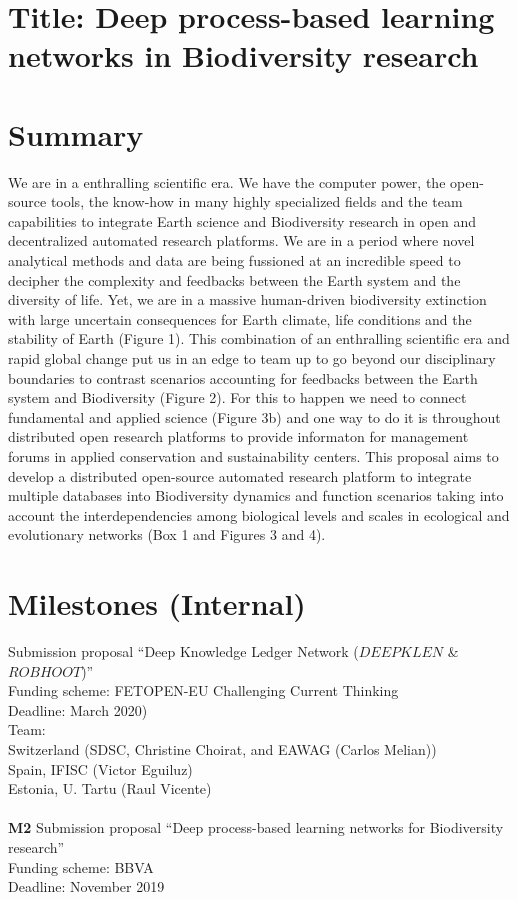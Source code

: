 \documentclass[authoryear,1p,12pt]{elsarticle}
\begin{document}
\section{{\bf Title: Deep process-based learning networks in Biodiversity research}}


\section{{\bf Summary}}
We are in a enthralling scientific era. We have the computer power,
the open-source tools, the know-how in many highly specialized fields
and the team capabilities to integrate Earth science and Biodiversity
research in open and decentralized automated research platforms. We
are in a period where novel analytical methods and data are being
fussioned at an incredible speed to decipher the complexity and
feedbacks between the Earth system and the diversity of life. Yet, we
are in a massive human-driven biodiversity extinction with large
uncertain consequences for Earth climate, life conditions and the
stability of Earth (Figure 1). This combination of an enthralling
scientific era and rapid global change put us in an edge to team up to
go beyond our disciplinary boundaries to contrast scenarios accounting
for feedbacks between the Earth system and Biodiversity (Figure
2). For this to happen we need to connect fundamental and applied
science (Figure 3b) and one way to do it is throughout distributed
open research platforms to provide informaton for management forums in
applied conservation and sustainability centers. This proposal aims to
develop a distributed open-source automated research platform to
integrate multiple databases into Biodiversity dynamics and function
scenarios taking into account the interdependencies among biological
levels and scales in ecological and evolutionary networks (Box 1 and
Figures 3 and 4).


\section{{\bf Milestones (Internal)}}

 Submission proposal ``Deep Knowledge Ledger Network ($DEEPKLEN$ \& $ROBHOOT$)''\\
Funding scheme: FETOPEN-EU Challenging Current Thinking\\
Deadline: March 2020)\\
Team:\\
Switzerland (SDSC, Christine Choirat, and EAWAG (Carlos Melian))\\
Spain, IFISC (Victor Eguiluz)\\
Estonia, U. Tartu (Raul Vicente)\\
\\
{\bf M2} Submission proposal ``Deep process-based learning networks for Biodiversity research''\\
Funding scheme: BBVA\\
Deadline: November 2019\\
\end{document}
